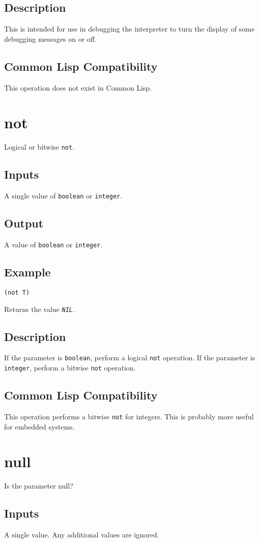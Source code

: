 \documentclass[10pt, openany]{book}
\newcommand{\constant}[1]{\emph{\texttt{#1}}}
\newcommand{\keyword}[1]{\texttt{#1}}
\newcommand{\datatype}[1]{\texttt{#1}}
\newcommand{\cl}{Common Lisp}
\begin{document}
\subsection{Description}
This is intended for use in debugging the interpreter to turn the display of some debugging messages on or off.
\subsection{Common Lisp Compatibility}
This operation does not exist in \cl.

\section{not}
Logical or bitwise \keyword{not}.
\subsection{Inputs}
A single value of \datatype{boolean} or \datatype{integer}.
\subsection{Output}
A value of \datatype{boolean} or \datatype{integer}.
\subsection{Example}
\begin{lstlisting}
(not T)
\end{lstlisting}
Returns the value \constant{NIL}.
\subsection{Description}
If the parameter is \datatype{boolean}, perform a logical \keyword{not} operation.  If the parameter is \datatype{integer}, perform a bitwise \keyword{not} operation.
\subsection{Common Lisp Compatibility}
This operation performs a bitwise \keyword{not} for integers.  This is probably more useful for embedded systems.

\section{null}
Is the parameter null?
\subsection{Inputs}
A single value.  Any additional values are ignored.
\end{document}
